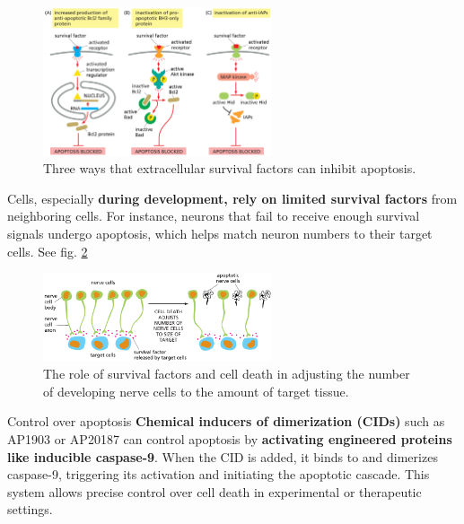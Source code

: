 \documentclass[../main.tex]{subfiles}
\begin{document}
\begin{figure}[H]
	\centering
	\includegraphics[width = 0.6\textwidth]{12}
	\caption{Three ways that extracellular survival factors can inhibit apoptosis.}
	\label{survival-factors}
\end{figure}
Cells, especially\textbf{ during development, rely on limited survival factors} from neighboring cells. For instance, neurons that fail to receive enough survival signals undergo apoptosis, which helps match neuron numbers to their target cells. See fig. \ref{Neurons-survival}
\begin{figure}[H]
	\centering
	\includegraphics[width = 0.6\textwidth]{13}
	\caption{The role of survival factors and cell death in adjusting the number of developing nerve cells to the amount of target tissue.}
	\label{Neurons-survival}
\end{figure}


\begin{RemarkWithTitel}{Control over apoptosis}
	\textbf{Chemical inducers of dimerization (CIDs)} such as AP1903 or AP20187 can control apoptosis by \textbf{activating engineered proteins like inducible caspase-9}. When the CID is added, it binds to and dimerizes caspase-9, triggering its activation and initiating the apoptotic cascade. This system allows precise control over cell death in experimental or therapeutic settings.
\end{RemarkWithTitel}
\end{document}
